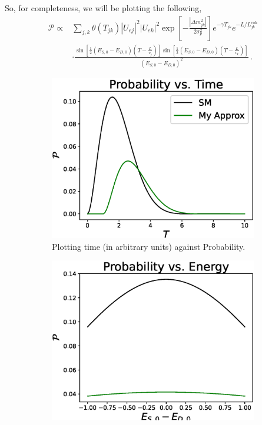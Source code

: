 \documentclass[10pt]{article}
\begin{document}
So, for completeness, we will be plotting the following,
\begin{equation}
  \begin{split}
    \mathcal{P} \propto & \sum_{j,k}\theta(T_{jk})|U_{ej}|^{2}|U_{ek}|^{2}\exp\left[-\frac{|\Delta m_{jk}^{2}|}{2\sigma^{2}_{p}}\right]e^{-\gamma T_{jk}}e^{-L/L_{jk}^{\text{coh}}} \\
    & \cdot \frac{\sin\left[\frac{1}{2}(E_{S,0} - E_{D,0})(T - \frac{L}{v_{j}})\right]\sin\left[\frac{1}{2}(E_{S,0} - E_{D,0})(T - \frac{L}{v_{k}})\right]}{(E_{S,0} - E_{D,0})^{2}}\, .
  \end{split}
\end{equation}

\begin{figure}
  \centering
  \begin{subfigure}[b]{0.4\textwidth}
    \centering
    \includegraphics[width=\textwidth]{plots/T_plot.eps}
    \caption{Plotting time (in arbitrary units) against Probability.}
    \label{fig:time}
  \end{subfigure}
  \hspace{2em}
  \begin{subfigure}[b]{0.4\textwidth}
    \centering
    \includegraphics[width=\textwidth]{plots/E_plot.eps}

\end{subfigure}
\end{figure}
\end{document}
